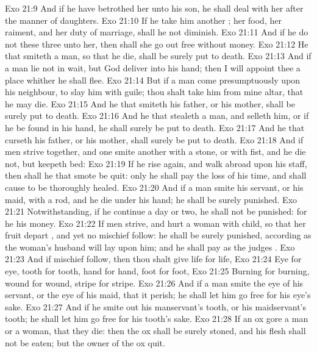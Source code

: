 \vs Exo 21:9 And if he have betrothed her unto his son, he shall deal with her after the manner of daughters.
\vs Exo 21:10 If he take him another ; her food, her raiment, and her duty of marriage, shall he not diminish.
\vs Exo 21:11 And if he do not these three unto her, then shall she go out free without money.
\vs Exo 21:12 He that smiteth a man, so that he die, shall be surely put to death.
\vs Exo 21:13 And if a man lie not in wait, but God deliver  into his hand; then I will appoint thee a place whither he shall flee.
\vs Exo 21:14 But if a man come presumptuously upon his neighbour, to slay him with guile; thou shalt take him from mine altar, that he may die.
\vs Exo 21:15 And he that smiteth his father, or his mother, shall be surely put to death.
\vs Exo 21:16 And he that stealeth a man, and selleth him, or if he be found in his hand, he shall surely be put to death.
\vs Exo 21:17 And he that curseth his father, or his mother, shall surely be put to death.
\vs Exo 21:18 And if men strive together, and one smite another with a stone, or with  fist, and he die not, but keepeth  bed:
\vs Exo 21:19 If he rise again, and walk abroad upon his staff, then shall he that smote  be quit: only he shall pay  the loss of his time, and shall cause  to be thoroughly healed.
\vs Exo 21:20 And if a man smite his servant, or his maid, with a rod, and he die under his hand; he shall be surely punished.
\vs Exo 21:21 Notwithstanding, if he continue a day or two, he shall not be punished: for he  his money.
\vs Exo 21:22 If men strive, and hurt a woman with child, so that her fruit depart , and yet no mischief follow: he shall be surely punished, according as the woman's husband will lay upon him; and he shall pay as the judges .
\vs Exo 21:23 And if  mischief follow, then thou shalt give life for life,
\vs Exo 21:24 Eye for eye, tooth for tooth, hand for hand, foot for foot,
\vs Exo 21:25 Burning for burning, wound for wound, stripe for stripe.
\vs Exo 21:26 And if a man smite the eye of his servant, or the eye of his maid, that it perish; he shall let him go free for his eye's sake.
\vs Exo 21:27 And if he smite out his manservant's tooth, or his maidservant's tooth; he shall let him go free for his tooth's sake.
\vs Exo 21:28 If an ox gore a man or a woman, that they die: then the ox shall be surely stoned, and his flesh shall not be eaten; but the owner of the ox  quit.
